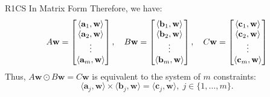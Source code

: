 \documentclass{beamer}
\begin{document}
\begin{frame}{R1CS In Matrix Form}
        Therefore, we have:
        \vspace{-5pt}
        {\scriptsize \begin{equation*}
            A\mathbf{w} = \begin{bmatrix}
                \langle \mathbf{a}_1, \mathbf{w}\rangle \\
                \langle \mathbf{a}_2, \mathbf{w}\rangle \\
                \vdots \\
                \langle \mathbf{a}_m, \mathbf{w}\rangle 
            \end{bmatrix}, \quad
            B\mathbf{w} = \begin{bmatrix}
                \langle \mathbf{b}_1, \mathbf{w}\rangle \\
                \langle \mathbf{b}_2, \mathbf{w}\rangle \\
                \vdots \\
                \langle \mathbf{b}_m, \mathbf{w}\rangle 
            \end{bmatrix}, \quad
            C\mathbf{w} = \begin{bmatrix}
                \langle \mathbf{c}_1, \mathbf{w}\rangle \\
                \langle \mathbf{c}_2, \mathbf{w}\rangle \\
                \vdots \\
                \langle \mathbf{c}_m, \mathbf{w}\rangle 
            \end{bmatrix}
            \vspace{-5pt}
        \end{equation*}}
        Thus, {\small $A\mathbf{w} \odot B\mathbf{w} = C\mathbf{w}$} is equivalent to the system of $m$ constraints:
        \vspace{-5pt}
        {\small \begin{equation*}
            \langle \mathbf{a}_j, \mathbf{w}\rangle \times \langle \mathbf{b}_j, \mathbf{w} \rangle = \langle \mathbf{c}_j, \mathbf{w} \rangle, \; j \in \{1,\dots,m\}.
        \end{equation*}}
    \end{frame}
\end{document}
